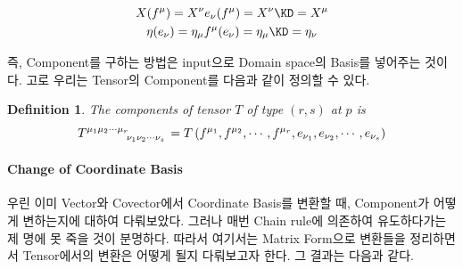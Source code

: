 \documentclass[final]{IEEEphot} %
\numberwithin{equation}{section} %
\numberwithin{figure}{section} %
\numberwithin{table}{section} %
\theoremstyle{plain}
\newtheorem{defn}{Definition} %
\newcommand{\VS}{\vspace{0.3cm}}
\newcommand{\BKS}[1]{\left( #1 \right)}
\begin{document}
\begin{gather*}
 X(f^{\mu}) = X^{\nu}e_{\nu}(f^{\mu}) = X^{\nu} \KD = X^{\mu} \\
 \eta(e_{\nu}) = \eta_{\mu} f^{\mu}(e_{\nu}) = \eta_{\mu} \KD = \eta_{\nu}
\end{gather*}

즉, Component를 구하는 방법은 input으로 Domain space의 Basis를 넣어주는 것이다. 고로 우리는 Tensor의 Component를 다음과 같이 정의할 수 있다.


\begin{defn}
 The components of tensor $T$ of type $(r,s)$ at $p$ is
 \begin{equation*}
  \tensor{T}{^{\mu_1}^{\mu_2}^{\cdots}^{\mu_r}_{\nu_1}_{\nu_2}_{\cdots}_{\nu_s}} = T \BKS{f^{\mu_1},f^{\mu_2},\cdots,f^{\mu_r},e_{\nu_1},e_{\nu_2},\cdots,e_{\nu_s}}
 \end{equation*}

\end{defn}

\VS

\paragraph{Change of Coordinate Basis}

우린 이미 Vector와 Covector에서 Coordinate Basis를 변환할 때, Component가 어떻게 변하는지에 대하여 다뤄보았다. 그러나 매번 Chain rule에 의존하여 유도하다가는
제 명에 못 죽을 것이 분명하다. 따라서 여기서는 Matrix Form으로 변환들을 정리하면서 Tensor에서의 변환은 어떻게 될지 다뤄보고자 한다. 그 결과는 다음과 같다.

\VS
\end{document}
